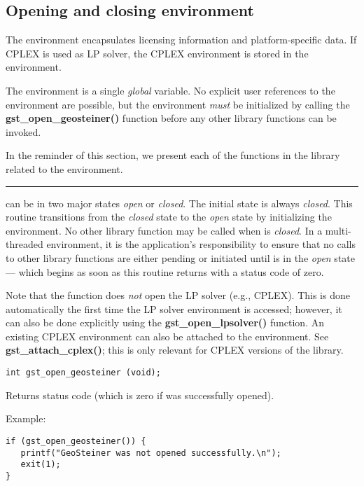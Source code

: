 \clearpage\subsection{Opening and closing \geosteiner{} environment}
\label{environment_functions}
The \geosteiner{} environment encapsulates licensing information and 
platform-specific data. If CPLEX is used as LP solver, the CPLEX
environment is stored in the \geosteiner{} environment. 

The environment is a single {\em global} variable. No explicit user
references to the environment are possible, but the environment {\em
  must} be initialized by calling the {\bf gst\_open\_geosteiner()}
function before any other library functions can be invoked.

In the reminder of this section, we present each of the functions in
the library related to the \geosteiner{} environment.

\clearpage{}
\label{gst_open_geosteiner}

\hrule
\vskip 0.25in
\geosteiner{} can be in two major states {\em open} or {\em closed}.  The
initial state is always {\em closed}.  This routine transitions
\geosteiner{} from the {\em closed} state to the {\em open} state by 
initializing the \geosteiner{} environment.
No other \geosteiner{} library function may be called when \geosteiner{} is 
{\em closed}.  In a multi-threaded environment, it is the
application's responsibility to ensure that no calls to other
\geosteiner{} library functions are either pending or initiated until
\geosteiner{} is in the {\em open} state --- which begins as soon as
this routine returns with a status code of zero.

Note that the function does {\em not} open the LP solver
(e.g., CPLEX). This is done automatically the first time the LP solver
environment is accessed; however, it can also be done explicitly
using the {\bf gst\_open\_lpsolver()} function.
An existing CPLEX environment can also be attached to the \geosteiner{} 
environment.  See {\bf gst\_attach\_cplex()}; this is only relevant
for CPLEX versions of the library.

\begin{verbatim}
int gst_open_geosteiner (void);

\end{verbatim}
Returns status code (which is zero if \geosteiner{} was successfully opened).

\bigskip{}Example:
{\footnotesize
\begin{verbatim}
if (gst_open_geosteiner()) {
   printf("GeoSteiner was not opened successfully.\n");
   exit(1);
}
\end{verbatim}
}
\clearpage{}
\label{gst_close_geosteiner}

